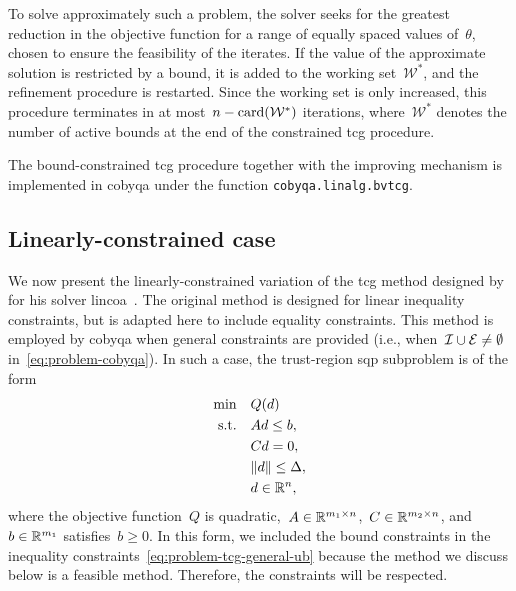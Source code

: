 To solve approximately such a problem, the solver seeks for the greatest reduction in the objective function for a range of equally spaced values of~$\theta$, chosen to ensure the feasibility of the iterates.
If the value of the approximate solution is restricted by a bound, it is added to the working set~$\mathcal{W}^{\ast}$, and the refinement procedure is restarted.
Since the working set is only increased, this procedure terminates in at most~$n - \operatorname{card}(\mathcal{W}^{\ast})$ iterations, where~$\mathcal{W}^{\ast}$ denotes the number of active bounds at the end of the constrained \gls{tcg} procedure.

The bound-constrained \gls{tcg} procedure together with the improving mechanism is implemented in \gls{cobyqa} under the function \texttt{cobyqa.linalg.bvtcg}.

\subsection{Linearly-constrained case}

We now present the linearly-constrained variation of the \gls{tcg} method designed by \citeauthor{Powell_2015} for his solver \gls{lincoa}~\cite{Powell_2015}.
The original method is designed for linear inequality constraints, but is adapted here to include equality constraints.
This method is employed by \gls{cobyqa} when general constraints are provided (i.e., when~$\mathcal{I} \cup \mathcal{E} \neq \emptyset$ in~\cref{eq:problem-cobyqa}).
In such a case, the trust-region \gls{sqp} subproblem is of the form
\begin{subequations}
    \label{eq:problem-tcg-general}
    \begin{align}
        \min        & \quad Q(\step)\\
        \text{s.t.} & \quad A \step \le b, \label{eq:problem-tcg-general-ub}\\
                    & \quad C \step = 0,\\
                    & \quad \norm{\step} \le \rad,\\
                    & \quad \step \in \R^n, \nonumber
    \end{align}
\end{subequations}
where the objective function~$Q$ is quadratic,~$A \in \mathbb{R}^{m_1 \times n}$,~$C \in \mathbb{R}^{m_2 \times n}$, and~$b \in \mathbb{R}^{m_1}$ satisfies~$b \ge 0$.
In this form, we included the bound constraints in the inequality constraints~\cref{eq:problem-tcg-general-ub} because the method we discuss below is a feasible method.
Therefore, the constraints will be respected.

